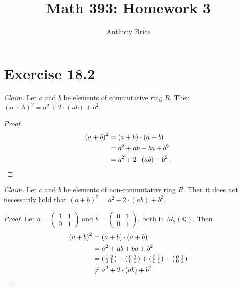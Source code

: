 \documentclass{abrice}
\title{Math 393: Homework 3}
\author{Anthony Brice}
\newcommand{\Q}{\mathbb{Q}}
\begin{document}
\maketitle

\section{Exercise 18.2}

\emph{Claim.} Let $a$ and $b$ be elements of commutative ring $R$. Then ${(a + b)}^2 = a^2
+ 2 \cdot (ab) + b^2$.

\begin{proof}
  \begin{align*}
    {(a + b)}^2
    &= (a + b) \cdot (a + b) \\
    &= a^2 + ab + ba + b^2 \\
    &= a^2 + 2 \cdot (ab) + b^2\, . \qedhere
  \end{align*}
\end{proof}

\noindent
\emph{Claim.} Let $a$ and $b$ be elements of non-commutative ring $R$. Then it
does not necessarily hold that ${(a + b)}^2 = a^2 + 2 \cdot (ab) + b^2$.

\begin{proof}
  Let $a = \left(\begin{smallmatrix} 1&1 \\ 0&1 \end{smallmatrix} \right)$ and
  $b = \left( \begin{smallmatrix} 0&1 \\ 0&1 \end{smallmatrix} \right)$, both in
  $M_2(\Q)$. Then
  \begin{align*}
    {(a + b)}^2
    &= (a + b) \cdot (a + b) \\
    &= a^2 + ab + ba + b^2 \\
    &= \left(  \begin{smallmatrix} 1&2 \\ 0&1 \end{smallmatrix} \right)
      + \left( \begin{smallmatrix} 0&2 \\ 0&1 \end{smallmatrix} \right)
      + \left( \begin{smallmatrix} 0&1 \\ 0&1 \end{smallmatrix} \right)                                       + \left( \begin{smallmatrix} 0&1 \\ 0&1 \end{smallmatrix} \right) \\
    &\neq a^2 + 2 \cdot (ab) + b^2\, . \qedhere
  \end{align*}
\end{proof}
\end{document}
